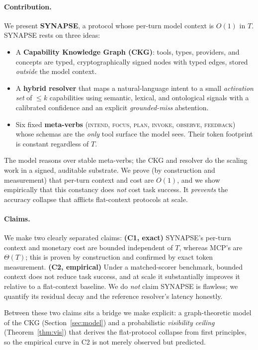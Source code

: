 \documentclass[11pt]{article}
\theoremstyle{plain}
\theoremstyle{definition}
\begin{document}
\paragraph{Contribution.} We present \textbf{SYNAPSE}, a protocol whose per-turn
model context is $O(1)$ in $T$. SYNAPSE rests on three ideas:
\begin{itemize}
  \item A \textbf{Capability Knowledge Graph (CKG)}: tools, types, providers,
  and concepts are typed, cryptographically signed nodes with typed edges,
  stored \emph{outside} the model context.
  \item A \textbf{hybrid resolver} that maps a natural-language intent to a
  small \emph{activation set} of $\le k$ capabilities using semantic, lexical,
  and ontological signals with a calibrated confidence and an explicit
  \emph{grounded-miss} abstention.
  \item Six fixed \textbf{meta-verbs} (\textsc{intend, focus, plan, invoke,
  observe, feedback}) whose schemas are the \emph{only} tool surface the model
  sees. Their token footprint is constant regardless of $T$.
\end{itemize}
The model reasons over stable meta-verbs; the CKG and resolver do the scaling
work in a signed, auditable substrate. We prove (by construction and
measurement) that per-turn context and cost are $O(1)$, and we show empirically
that this constancy does \emph{not} cost task success. It \emph{prevents} the
accuracy collapse that afflicts flat-context protocols at scale.

\paragraph{Claims.} We make two clearly separated claims:
\textbf{(C1, exact)} SYNAPSE's per-turn context and monetary cost are bounded
independent of $T$, whereas MCP's are $\Theta(T)$; this is proven by
construction and confirmed by exact token measurement.
\textbf{(C2, empirical)} Under a matched-scorer benchmark, bounded context does
not reduce task success, and at scale it substantially improves it relative to a
flat-context baseline. We do \emph{not} claim SYNAPSE is flawless; we quantify
its residual decay and the reference resolver's latency honestly.

Between these two claims sits a bridge we make explicit: a graph-theoretic model
of the CKG (Section~\ref{sec:model}) and a probabilistic \emph{visibility
ceiling} (Theorem~\ref{thm:vis}) that derives the flat-protocol collapse from
first principles, so the empirical curve in C2 is not merely observed but
predicted.
\end{document}
